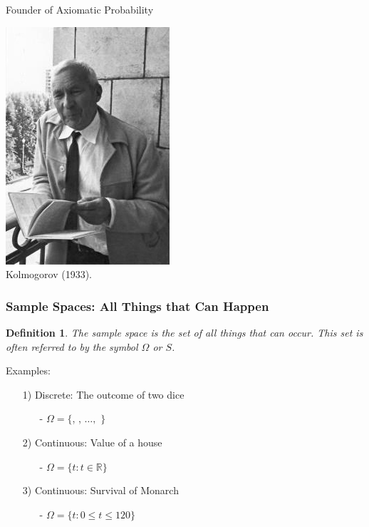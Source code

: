 \documentclass[aspectratio=169, handout]{beamer}
\def\die#1{{\domino#1}}
\newtheorem{defn}{Definition}
\numberwithin{equation}{section}
\begin{document}
\begin{frame}{Founder of Axiomatic Probability}
\begin{center}
\includegraphics[width=1.5 in]{images/Kolmogorov.jpeg}\\
Kolmogorov (1933).
\end{center}
\end{frame}

\begin{frame}
\frametitle{Sample Spaces: All Things that Can Happen}

\begin{defn}
The \alert{sample space} is the set of all things that can occur.  This set is often referred to by the symbol $\Omega$ or $S$.
\end{defn}
\pause 
{Examples: } \pause 
\begin{itemize}
\item[1)] Discrete: The outcome of two dice 
\begin{itemize}
\item[-] $\Omega = \{$\die1\die1, \die1\die2 ,  $\hdots,$ \die6\die6$ \}$ \pause
\end{itemize}
\item[2)] Continuous: Value of a house
\begin{itemize}
\item[-] $\Omega = \{t: t\in \mathbb{R}\}$ 
\end{itemize}\pause 
\item[3)] Continuous: Survival of Monarch 
\begin{itemize}
\item[-] $\Omega = \{t: 0\leq t \leq 120\}$ 
\end{itemize}

\end{itemize}
\end{frame}
\end{document}
